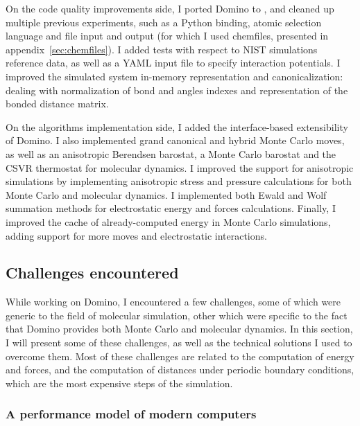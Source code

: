 \documentclass[thesis]{subfiles}
\begin{document}
On the code quality improvements side, I ported Domino to , and cleaned up
multiple previous experiments, such as a Python binding, atomic selection
language and file input and output (for which I used chemfiles, presented in
appendix~\ref{sec:chemfiles}). I added tests with respect to NIST simulations
reference data\cite{NIST}, as well as a YAML input file to specify interaction
potentials. I improved the simulated system in-memory representation and
canonicalization: dealing with normalization of bond and angles indexes and
representation of the bonded distance matrix.

On the algorithms implementation side, I added the interface-based extensibility
of Domino. I also implemented grand canonical and hybrid Monte Carlo moves, as
well as an anisotropic Berendsen barostat, a Monte Carlo barostat and the CSVR
thermostat for molecular dynamics. I improved the support for anisotropic
simulations by implementing anisotropic stress and pressure calculations for
both Monte Carlo and molecular dynamics. I implemented both Ewald and Wolf
summation methods for electrostatic energy and forces calculations. Finally, I
improved the cache of already-computed energy in Monte Carlo simulations, adding
support for more moves and electrostatic interactions.

\subsection{Challenges encountered}

While working on Domino, I encountered a few challenges, some of which were
generic to the field of molecular simulation, other which were specific to the
fact that Domino provides both Monte Carlo and molecular dynamics. In this
section, I will present some of these challenges, as well as the technical
solutions I used to overcome them. Most of these challenges are related to the
computation of energy and forces, and the computation of distances under
periodic boundary conditions, which are the most expensive steps of the
simulation.

\subsubsection{A performance model of modern computers}
\end{document}
